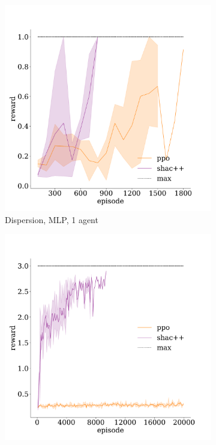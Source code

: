 
\begin{figure}[!t]
    \centering
    \begin{subfigure}[b]{0.30\textwidth}
        \includegraphics[width=\textwidth]{figs/dispersion-1-mlp.pdf}
        \caption{Dispersion, MLP, 1 agent}
        \label{fig:dispersion-mlp-1}
    \end{subfigure}
    \begin{subfigure}[b]{0.30\textwidth}
        \includegraphics[width=\textwidth]{figs/dispersion-3-transformer.pdf}

\end{subfigure}
\end{figure}
